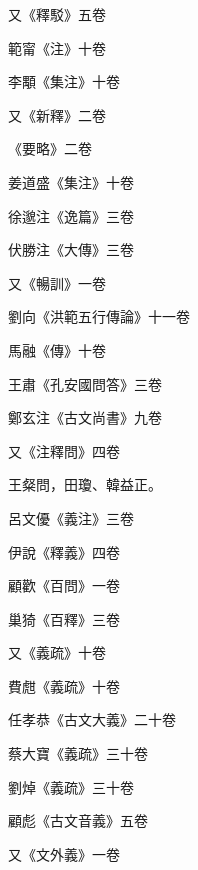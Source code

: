 \begin{pinyinscope}
 又《釋駁》五卷



 範甯《注》十卷



 李顒《集注》十卷



 又《新釋》二卷



 《要略》二卷



 姜道盛《集注》十卷



 徐邈注《逸篇》三卷



 伏勝注《大傳》三卷



 又《暢訓》一卷



 劉向《洪範五行傳論》十一卷



 馬融《傳》十卷



 王肅《孔安國問答》三卷



 鄭玄注《古文尚書》九卷



 又《注釋問》四卷



 王粲問，田瓊、韓益正。



 呂文優《義注》三卷



 伊說《釋義》四卷



 顧歡《百問》一卷



 巢猗《百釋》三卷



 又《義疏》十卷



 費甝《義疏》十卷



 任孝恭《古文大義》二十卷



 蔡大寶《義疏》三十卷



 劉焯《義疏》三十卷



 顧彪《古文音義》五卷



 又《文外義》一卷




\end{pinyinscope}
